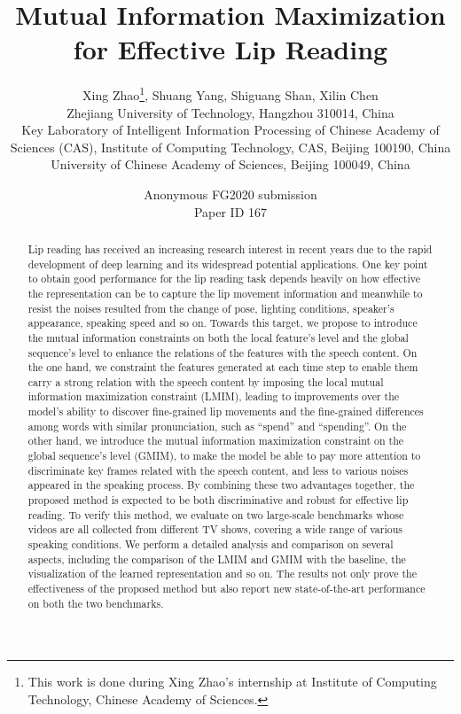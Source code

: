 \documentclass[a4paper, 10pt, conference]{ieeeconf}      \usepackage{FG2020}
\title{\LARGE \bf
Mutual Information Maximization for Effective Lip Reading
}
\author{\parbox{16cm}{\centering
    {\large Xing Zhao\thanks{ This work is done during Xing Zhao's internship at Institute of Computing Technology, Chinese Academy of Sciences.}, Shuang Yang, Shiguang Shan, Xilin Chen}\\
    {\normalsize
     Zhejiang University of Technology, Hangzhou 310014, China\\
     Key Laboratory of Intelligent Information Processing of Chinese Academy of Sciences (CAS), Institute of Computing Technology, CAS, Beijing 100190, China\\
     University of Chinese Academy of Sciences, Beijing 100049, China}}
}
\def\FGPaperID{167}
\begin{document}
\ifFGfinal
\thispagestyle{empty}
\pagestyle{empty}
\else
\author{Anonymous FG2020 submission\\ Paper ID \FGPaperID \\}
\pagestyle{plain}
\fi
\maketitle



\begin{abstract}
Lip reading has received an increasing research interest in recent years due to the rapid development of deep learning and its widespread potential applications. One key point to obtain good performance for the lip reading task depends heavily on how effective the representation can be to capture the lip movement information and meanwhile to resist the noises resulted from the change of pose, lighting conditions, speaker's appearance, speaking speed and so on. Towards this target, we propose to introduce the mutual information constraints on both the local feature's level and the global sequence's level to enhance the relations of the features with the speech content. On the one hand, we constraint the features generated at each time step to enable them carry a strong relation with the speech content by imposing the local mutual information maximization constraint (LMIM), leading to improvements over the model's ability to discover fine-grained lip movements and the fine-grained differences among words with similar pronunciation, such as ``spend'' and ``spending''. On the other hand, we introduce the mutual information maximization constraint on the global sequence's level (GMIM), to make the model be able to pay more attention to discriminate key frames related with the speech content, and less to various noises appeared in the speaking process. By combining these two advantages together, the proposed method is expected to be both discriminative and robust for effective lip reading. To verify this method, we evaluate on two large-scale benchmarks whose videos are all collected from different TV shows, covering a wide range of various speaking conditions. We perform a detailed analysis and comparison on several aspects, including the comparison of the LMIM and GMIM with the baseline, the visualization of the learned representation and so on. The results not only prove the effectiveness of the proposed method but also report new state-of-the-art performance on both the two benchmarks.
\end{abstract}
\end{document}

